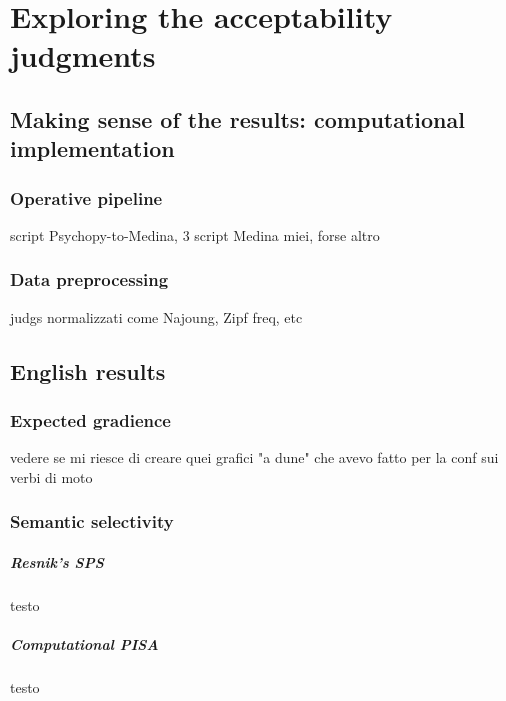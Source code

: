\setchapterpreamble[u]{\margintoc}
\chapter{Exploring the acceptability judgments}


\section{Making sense of the results: computational implementation} 

\subsection{Operative pipeline} 

script Psychopy-to-Medina, 3 script Medina miei, forse altro

\subsection{Data preprocessing} 

judgs normalizzati come Najoung, Zipf freq, etc


\section{English results} 

\subsection{Expected gradience} 

vedere se mi riesce di creare quei grafici "a dune" che avevo fatto per la conf sui verbi di moto

\subsection{Semantic selectivity} 

\paragraph{Resnik's SPS} testo

\paragraph{Computational PISA} testo

